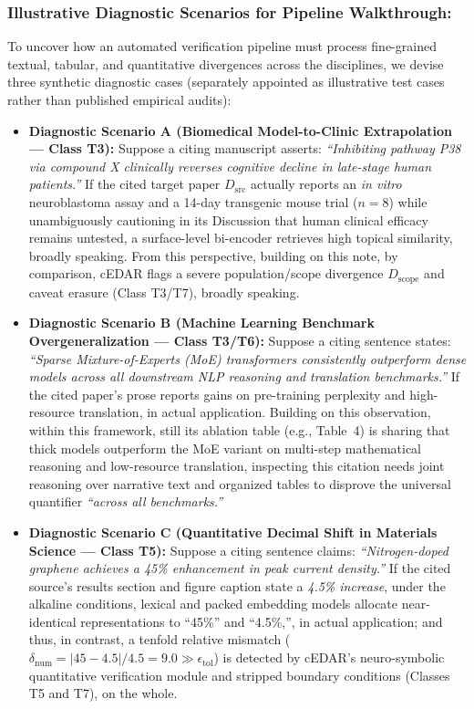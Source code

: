 \documentclass[sigconf]{acmart}
\begin{document}
\subsubsection{Illustrative Diagnostic Scenarios for Pipeline Walkthrough:}
To uncover how an automated verification pipeline must process fine-grained textual, tabular, and quantitative divergences across the disciplines, we devise three synthetic diagnostic cases (separately appointed as illustrative test cases rather than published empirical audits):
\begin{itemize}
\item \textbf{Diagnostic Scenario A (Biomedical Model-to-Clinic Extrapolation --- Class T3):} Suppose a citing manuscript asserts: \emph{``Inhibiting pathway P38 via compound X clinically reverses cognitive decline in late-stage human patients.''} If the cited target paper $D_{\text{src}}$ actually reports an \emph{in vitro} neuroblastoma assay and a 14-day transgenic mouse trial ($n=8$) while unambiguously cautioning in its Discussion that human clinical efficacy remains untested, a surface-level bi-encoder retrieves high topical similarity, broadly speaking. From this perspective, building on this note, by comparison, cEDAR flags a severe population/scope divergence $D_{\text{scope}}$ and caveat erasure (Class T3/T7), broadly speaking.
\item \textbf{Diagnostic Scenario B (Machine Learning Benchmark Overgeneralization --- Class T3/T6):} Suppose a citing sentence states: \emph{``Sparse Mixture-of-Experts (MoE) transformers consistently outperform dense models across all downstream NLP reasoning and translation benchmarks.''} If the cited paper's prose reports gains on pre-training perplexity and high-resource translation, in actual application. Building on this observation, within this framework, still its ablation table (e.g., Table~4) is sharing that thick models outperform the MoE variant on multi-step mathematical reasoning and low-resource translation, inspecting this citation needs joint reasoning over narrative text and organized tables \cite{herzig2020tapas,lu2023scitab} to disprove the universal quantifier \emph{``across all benchmarks.''}
\item \textbf{Diagnostic Scenario C (Quantitative Decimal Shift in Materials Science --- Class T5):} Suppose a citing sentence claims: \emph{``Nitrogen-doped graphene achieves a 45\% enhancement in peak current density.''} If the cited source's results section and figure caption state a \emph{4.5\% increase}, under the alkaline conditions, lexical and packed embedding models allocate near-identical representations to ``45\%'' and ``4.5\%,'', in actual application; and thus, in contrast, a tenfold relative mismatch ($\delta_{\text{num}} = |45 - 4.5|/4.5 = 9.0 \gg \epsilon_{\text{tol}}$) is detected by cEDAR's neuro-symbolic quantitative verification module and stripped boundary conditions (Classes T5 and T7), on the whole.
\end{itemize}
\end{document}
